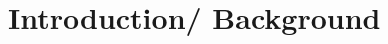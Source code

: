 \documentclass[12pt]{article}
\begin{document}
\setcounter{page}{1}
\vspace{-0.2in}
\section{Introduction/ Background}
\label{sec:intro}
\vspace{-0.2in}
\doublespacing
\end{document}
